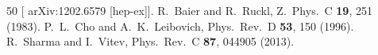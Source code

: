 \documentclass[twocolumn,amsmath,amssymb]{snp}
\begin{document}
\begin{thebibliography}{50}
  [ arXiv:1202.6579 [hep-ex]].
  R.~Baier and R.~Ruckl,
  Z.\ Phys.\ C {\bf 19}, 251 (1983).
  P.~L.~Cho and A.~K.~Leibovich,
  Phys.\ Rev.\ D {\bf 53}, 150 (1996).
  R.~Sharma and I.~Vitev,
  Phys.\ Rev.\ C {\bf 87}, 044905 (2013).
\end{thebibliography}
\end{document}
